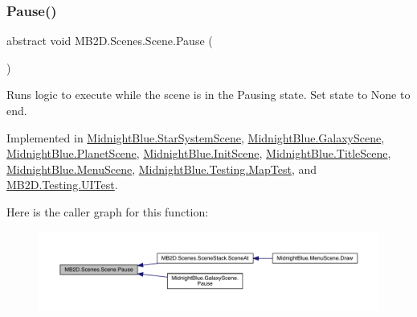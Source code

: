 \subsubsection{\texorpdfstring{Pause()}{Pause()}}
{\footnotesize\ttfamily abstract void M\+B2\+D.\+Scenes.\+Scene.\+Pause (\begin{DoxyParamCaption}{ }\end{DoxyParamCaption})\hspace{0.3cm}{\ttfamily [pure virtual]}}



Runs logic to execute while the scene is in the Pausing state. Set state to None to end. 



Implemented in \hyperlink{class_midnight_blue_1_1_star_system_scene_a04e8bfcb31eebfd859c4bd543f0bb6f9}{Midnight\+Blue.\+Star\+System\+Scene}, \hyperlink{class_midnight_blue_1_1_galaxy_scene_aeb44afaeda2cccd225e64908bb76bee4}{Midnight\+Blue.\+Galaxy\+Scene}, \hyperlink{class_midnight_blue_1_1_planet_scene_abc077e1cd5f40879ca3af4224f0ff455}{Midnight\+Blue.\+Planet\+Scene}, \hyperlink{class_midnight_blue_1_1_init_scene_adbcab013e715e5c49ad09bcd0545d994}{Midnight\+Blue.\+Init\+Scene}, \hyperlink{class_midnight_blue_1_1_title_scene_a046934bfa3290d443b58bcc1de0919db}{Midnight\+Blue.\+Title\+Scene}, \hyperlink{class_midnight_blue_1_1_menu_scene_a7a2f8875f949d2ec2e6f3a8c6da7cedf}{Midnight\+Blue.\+Menu\+Scene}, \hyperlink{class_midnight_blue_1_1_testing_1_1_map_test_a7dba960137d634b15e4f4b7b3a86489f}{Midnight\+Blue.\+Testing.\+Map\+Test}, and \hyperlink{class_m_b2_d_1_1_testing_1_1_u_i_test_ae829ddfd489047674efb3131d360901a}{M\+B2\+D.\+Testing.\+U\+I\+Test}.

Here is the caller graph for this function\+:
\nopagebreak
\begin{figure}[H]
\begin{center}
\leavevmode
\includegraphics[width=350pt]{class_m_b2_d_1_1_scenes_1_1_scene_a0661eff0223150fa8e9ea88145409e5d_icgraph}
\end{center}
\end{figure}
\hypertarget{class_m_b2_d_1_1_scenes_1_1_scene_ad13639db22b059a1b714eefd9d927735}{}\label{class_m_b2_d_1_1_scenes_1_1_scene_ad13639db22b059a1b714eefd9d927735} 
